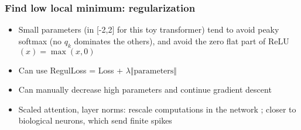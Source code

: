 \documentclass{beamer}
\begin{document}
\begin{frame}
\frametitle{Find low local minimum: regularization}
\begin{itemize}
\item Small parameters (in [-2,2] for this toy transformer) tend to avoid peaky softmax (no $q_k$ dominates the others), and avoid the zero flat part of ReLU$(x)=\max(x,0)$
\bigskip
\item Can use RegulLoss = Loss + $\lambda \Vert \text{parameters} \Vert$
\bigskip
\item Can manually decrease high parameters and continue gradient descent
\bigskip
\item Scaled attention, layer norms: rescale computations in the network ; closer to biological neurons, which send finite spikes
\end{itemize}
\end{frame}

\end{document}
